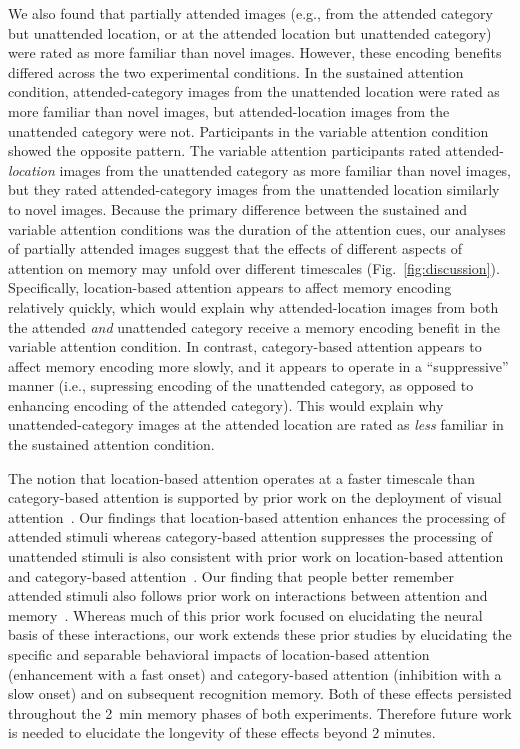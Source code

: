 \documentclass[english]{article}
\begin{document}
We also found that partially attended images (e.g., from the attended category
but unattended location, or at the attended location but unattended category)
were rated as more familiar than novel images. However, these encoding benefits
differed across the two experimental conditions. In the sustained attention
condition, attended-category images from the unattended location were rated as
more familiar than novel images, but attended-location images from the
unattended category were not. Participants in the variable attention condition
showed the opposite pattern. The variable attention participants rated
attended-\textit{location} images from the unattended category as more familiar
than novel images, but they rated attended-category images from the unattended
location similarly to novel images. Because the primary difference between the
sustained and variable attention conditions was the duration of the attention
cues, our analyses of partially attended images suggest that the effects of
different aspects of attention on memory may unfold over different timescales
(Fig.~\ref{fig:discussion}). Specifically, location-based attention appears to
affect memory encoding relatively quickly, which would explain why
attended-location images from both the attended \textit{and} unattended
category receive a memory encoding benefit in the variable attention condition.
In contrast, category-based attention appears to affect memory encoding more
slowly, and it appears to operate in a ``suppressive'' manner (i.e., supressing
encoding of the unattended category, as opposed to enhancing encoding of the
attended category). This would explain why unattended-category images at the
attended location are rated as \textit{less} familiar in the sustained
attention condition.

The notion that location-based attention operates at a faster timescale than
category-based attention is supported by prior work on the deployment of visual
attention~\citep{SotoBlan04, StopEtal07}. Our findings that location-based
attention enhances the processing of attended stimuli whereas category-based
attention suppresses the processing of unattended stimuli is also consistent
with prior work on location-based attention~\citep[e.g.,][]{IttiKoch01} and
category-based attention~\citep[e.g.,][]{MoheEtal14}. Our finding that people
better remember attended stimuli also follows prior work on interactions
between attention and memory~\citep{PallWagn02, ChunTurk07, AlyTurk16,
AlyTurk17, WittEtal18, MorrEtal14, BaleEtal21}. Whereas much of this prior work
focused on elucidating the neural basis of these interactions, our work extends
these prior studies by elucidating the specific and separable behavioral
impacts of location-based attention (enhancement with a fast onset) and
category-based attention (inhibition with a slow onset) and on subsequent
recognition memory. Both of these effects persisted throughout the 2~min memory
phases of both experiments. Therefore future work is needed to elucidate the
longevity of these effects beyond 2 minutes.
\end{document}
